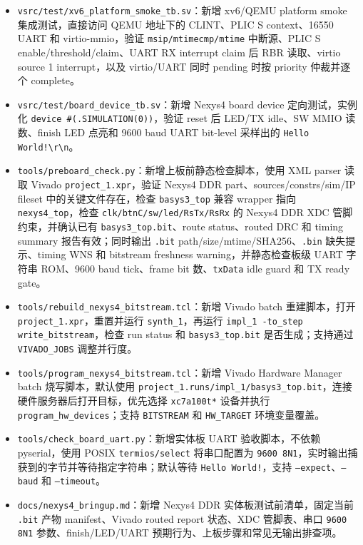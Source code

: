 \documentclass[UTF8,a4paper,11pt]{ctexart}
\begin{document}
\begin{itemize}
  \item \texttt{vsrc/test/xv6\_platform\_smoke\_tb.sv}：新增 xv6/QEMU platform smoke 集成测试，直接访问 QEMU 地址下的 CLINT、PLIC S context、16550 UART 和 virtio-mmio，验证 \texttt{msip/mtimecmp/mtime} 中断源、PLIC S enable/threshold/claim、UART RX interrupt claim 后 RBR 读取、virtio source 1 interrupt，以及 virtio/UART 同时 pending 时按 priority 仲裁并逐个 complete。
  \item \texttt{vsrc/test/board\_device\_tb.sv}：新增 Nexys4 board device 定向测试，实例化 \texttt{device \#(.SIMULATION(0))}，验证 reset 后 LED/TX idle、SW MMIO 读数、finish LED 点亮和 9600 baud UART bit-level 采样出的 \texttt{Hello World!\textbackslash r\textbackslash n}。
  \item \texttt{tools/preboard\_check.py}：新增上板前静态检查脚本，使用 XML parser 读取 Vivado \texttt{project\_1.xpr}，验证 Nexys4 DDR part、sources/constrs/sim/IP fileset 中的关键文件存在，检查 \texttt{basys3\_top} 兼容 wrapper 指向 \texttt{nexys4\_top}，检查 \texttt{clk/btnC/sw/led/RsTx/RsRx} 的 Nexys4 DDR XDC 管脚约束，并确认已有 \texttt{basys3\_top.bit}、route status、routed DRC 和 timing summary 报告有效；同时输出 \texttt{.bit} path/size/mtime/SHA256、\texttt{.bin} 缺失提示、timing WNS 和 bitstream freshness warning，并静态检查板级 UART 字符串 ROM、9600 baud tick、frame bit 数、\texttt{txData} idle guard 和 TX ready gate。
  \item \texttt{tools/rebuild\_nexys4\_bitstream.tcl}：新增 Vivado batch 重建脚本，打开 \texttt{project\_1.xpr}，重置并运行 \texttt{synth\_1}，再运行 \texttt{impl\_1 -to\_step write\_bitstream}，检查 run status 和 \texttt{basys3\_top.bit} 是否生成；支持通过 \texttt{VIVADO\_JOBS} 调整并行度。
  \item \texttt{tools/program\_nexys4\_bitstream.tcl}：新增 Vivado Hardware Manager batch 烧写脚本，默认使用 \texttt{project\_1.runs/impl\_1/basys3\_top.bit}，连接硬件服务器后打开目标，优先选择 \texttt{xc7a100t*} 设备并执行 \texttt{program\_hw\_devices}；支持 \texttt{BITSTREAM} 和 \texttt{HW\_TARGET} 环境变量覆盖。
  \item \texttt{tools/check\_board\_uart.py}：新增实体板 UART 验收脚本，不依赖 pyserial，使用 POSIX \texttt{termios/select} 将串口配置为 \texttt{9600 8N1}，实时输出捕获到的字节并等待指定字符串；默认等待 \texttt{Hello World!}，支持 \texttt{--expect}、\texttt{--baud} 和 \texttt{--timeout}。
  \item \texttt{docs/nexys4\_bringup.md}：新增 Nexys4 DDR 实体板测试前清单，固定当前 \texttt{.bit} 产物 manifest、Vivado routed report 状态、XDC 管脚表、串口 \texttt{9600 8N1} 参数、finish/LED/UART 预期行为、上板步骤和常见无输出排查项。

\end{itemize}
\end{document}
